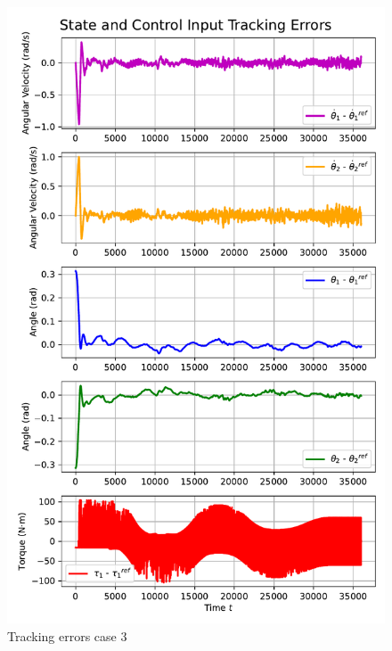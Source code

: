 \begin{figure}[htb]
    \centering
    \includegraphics[width=1\linewidth]{img/4-task4/MPC3_errors.pdf}
    \caption{Tracking errors case 3}
    \label{fig:dtheta1-evolution}
\end{figure}
